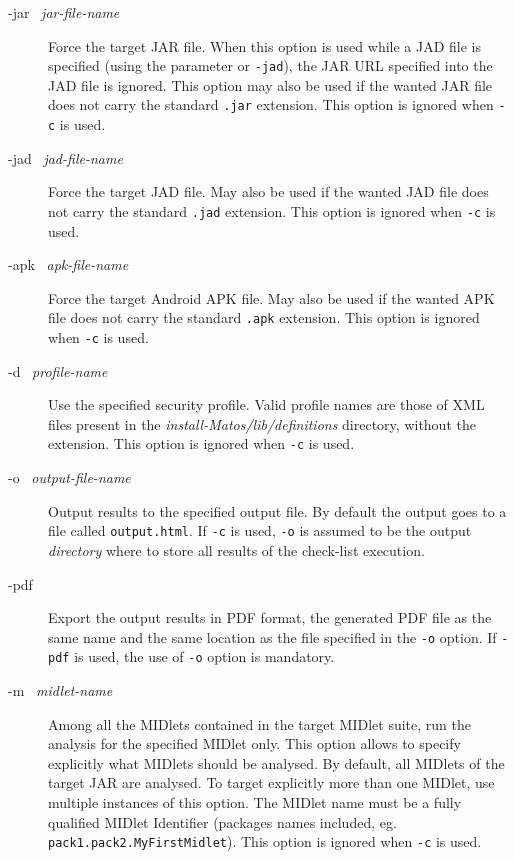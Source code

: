 \newcommand{\OptArg}[2]{\textsf{#1~\textit{#2}}}
\newcommand{\Opt}[1]{\textsf{#1}\xspace}
\newcommand{\File}[1]{\textit{#1}\xspace}
\begin{description}

\item[\OptArg{-jar }{jar-file-name}] Force the target JAR file. When
  this option is used while a JAD file is specified (using the parameter or \texttt{-jad}), the JAR URL
  specified into the JAD file is ignored. This option may also be used
  if the wanted JAR file does not carry the standard \texttt{.jar}
  extension.  This option is ignored when \texttt{-c} is used.

\item[\OptArg{-jad }{jad-file-name}] Force the target JAD file. May
  also be used if the wanted JAD file does not carry the standard \texttt{.jad}
  extension. This option is ignored when \texttt{-c} is used.
\item[\OptArg{-apk }{apk-file-name}] Force the target Android APK file. May
  also be used if the wanted APK file does not carry the standard \texttt{.apk}
  extension. This option is ignored when \texttt{-c} is used.
\item[\OptArg{-d }{profile-name}] Use the specified security profile. 
Valid profile names are those of XML files present in the 
\File{\emph{install-Matos}/lib/definitions} directory, without the
extension. This option is ignored when \texttt{-c} is used.

\item[\OptArg{-o }{output-file-name}] Output results to the specified
  output file. By default the output goes to a file called
  \texttt{output.html}. If \texttt{-c} is used, \texttt{-o} is assumed to be
  the output \emph{directory} where to store all results of the
  check-list execution. %

\item[\Opt{-pdf}] Export the output results in PDF format, the generated PDF
file as the same name and the same location as the file specified in the \texttt{-o}
option. If \texttt{-pdf} is used, the use of \texttt{-o} option is mandatory.

\item[\OptArg{-m }{midlet-name}] Among all the MIDlets contained in
  the target MIDlet suite, run the analysis for the specified MIDlet
  only. This option allows to specify explicitly what MIDlets should
  be analysed. By default, all MIDlets of the target JAR are
  analysed. To target explicitly more than one MIDlet, use multiple
  instances of this option. The MIDlet name must be a fully qualified
  MIDlet Identifier (packages names included, eg. \texttt{pack1.pack2.MyFirstMidlet}).
  This option is ignored when \texttt{-c} is used.


\end{description}
